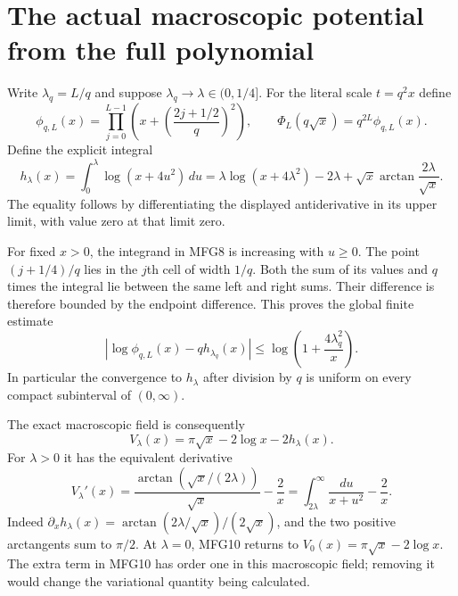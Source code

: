 \section{The actual macroscopic potential from the full polynomial}

Write $\lambda_q=L/q$ and suppose $\lambda_q\to\lambda\in(0,1/4]$.
For the literal scale $t=q^2x$ define
\[
 \phi_{q,L}(x)=\prod_{j=0}^{L-1}
             \left(x+\left(\frac{2j+1/2}{q}\right)^2\right),
 \qquad \Phi_L(q\sqrt x)=q^{2L}\phi_{q,L}(x).
 \tag{MFG7}
\]
Define the explicit integral
\[
 h_\lambda(x)=\int_0^\lambda\log(x+4u^2)\,du
 =\lambda\log(x+4\lambda^2)-2\lambda
                +\sqrt x\arctan\frac{2\lambda}{\sqrt x}.
 \tag{MFG8}
\]
The equality follows by differentiating the displayed antiderivative
in its upper limit, with value zero at that limit zero.

For fixed $x>0$, the integrand in MFG8 is increasing with $u\ge0$.
The point $(j+1/4)/q$ lies in the $j$th cell of width $1/q$.
Both the sum of its values and $q$ times the integral lie between
the same left and right sums. Their difference is therefore bounded
by the endpoint difference. This proves the global finite estimate
\[
 \left|\log\phi_{q,L}(x)-q h_{\lambda_q}(x)\right|
 \le\log\left(1+\frac{4\lambda_q^2}{x}\right).
 \tag{MFG9}
\]
In particular the convergence to $h_\lambda$ after division by $q$
is uniform on every compact subinterval of $(0,\infty)$.

The exact macroscopic field is consequently
\[
 \boxed{V_\lambda(x)=\pi\sqrt x-2\log x-2h_\lambda(x).}
 \tag{MFG10}
\]
For $\lambda>0$ it has the equivalent derivative
\[
 V_\lambda'(x)=\frac{\arctan(\sqrt x/(2\lambda))}{\sqrt x}-\frac2x
              =\int_{2\lambda}^{\infty}\frac{du}{x+u^2}-\frac2x.
 \tag{MFG11}
\]
Indeed $\partial_xh_\lambda(x)=
\arctan(2\lambda/\sqrt x)/(2\sqrt x)$, and the two positive
arctangents sum to $\pi/2$. At $\lambda=0$, MFG10 returns to
$V_0(x)=\pi\sqrt x-2\log x$. The extra term in MFG10 has order one
in this macroscopic field; removing it would change the variational
quantity being calculated.

